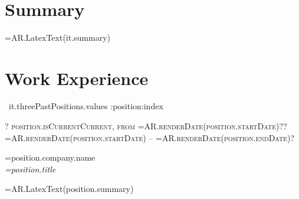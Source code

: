\documentclass[10pt]{article} %
\begin{document}
\color{text1} %


\par{\\ %
\vspace{20pt}
	

\begin{minipage}[t]{0.5\textwidth} %
\vspace{0pt} %
	

\section{Summary} 
\normalsize{ {{=AR.LatexText(it.summary)}} }\\


\section{Work Experience} 

{{~it.threePastPositions.values :position:index}}
{\raggedleft\textsc{ {{? position.isCurrent}}Current, from {{=AR.renderDate(position.startDate)}}{{??}}{{=AR.renderDate(position.startDate)}} -- {{=AR.renderDate(position.endDate)}}{{?}} }\par}

{\raggedright\large {{=position.company.name}} \\
\textit{ {{=position.title}} }\\[5pt]}

\normalsize{ {{=AR.LatexText(position.summary)}} }\\
{{~}}



\end{minipage} %
\hfill
\begin{minipage}[t]{0.44\textwidth} %
\vspace{0pt} %


\end{minipage}}
\end{document}
